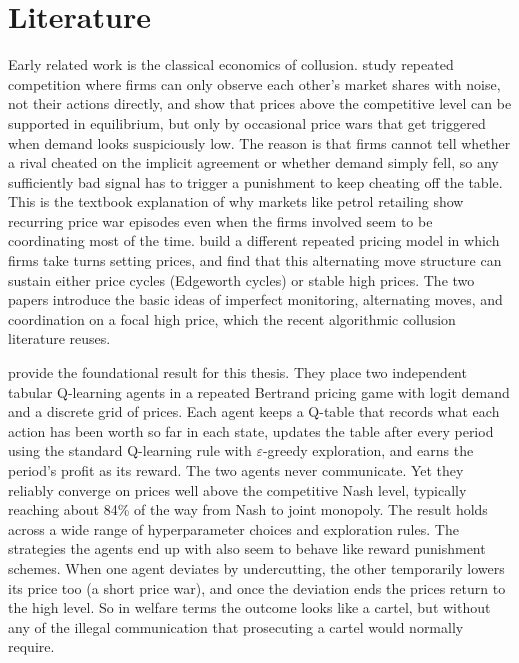\section{Literature}
\label{sec:literature}

Early related work is the classical economics of collusion. \citet{green1984} study repeated competition where firms can only observe each other's market shares with noise, not their actions directly, and show that prices above the competitive level can be supported in equilibrium, but only by occasional price wars that get triggered when demand looks suspiciously low. The reason is that firms cannot tell whether a rival cheated on the implicit agreement or whether demand simply fell, so any sufficiently bad signal has to trigger a punishment to keep cheating off the table. This is the textbook explanation of why markets like petrol retailing show recurring price war episodes even when the firms involved seem to be coordinating most of the time. \citet{maskin1988} build a different repeated pricing model in which firms take turns setting prices, and find that this alternating move structure can sustain either price cycles (Edgeworth cycles) or stable high prices. The two papers introduce the basic ideas of imperfect monitoring, alternating moves, and coordination on a focal high price, which the recent algorithmic collusion literature reuses.

\citet{calvano2020} provide the foundational result for this thesis. They place two independent tabular Q-learning agents \citep{watkins1992} in a repeated Bertrand pricing game with logit demand and a discrete grid of prices. Each agent keeps a Q-table that records what each action has been worth so far in each state, updates the table after every period using the standard Q-learning rule with $\varepsilon$-greedy exploration, and earns the period's profit as its reward. The two agents never communicate. Yet they reliably converge on prices well above the competitive Nash level, typically reaching about 84\% of the way from Nash to joint monopoly. The result holds across a wide range of hyperparameter choices and exploration rules. The strategies the agents end up with also seem to behave like reward punishment schemes. When one agent deviates by undercutting, the other temporarily lowers its price too (a short price war), and once the deviation ends the prices return to the high level. So in welfare terms the outcome looks like a cartel, but without any of the illegal communication that prosecuting a cartel would normally require.

